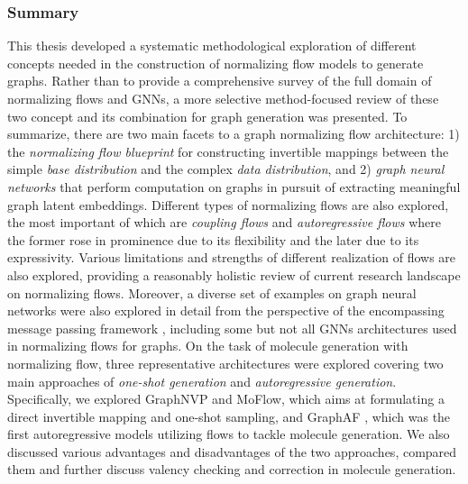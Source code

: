 \subsubsection{Summary}
This thesis developed a systematic methodological exploration of different
concepts needed in the construction of normalizing flow models to generate
graphs. Rather than to provide a comprehensive survey of the full domain of
normalizing flows and GNNs, a more selective method-focused review of these
two concept and its combination for graph generation was presented. To
summarize, there are two main facets to a graph normalizing flow architecture:
1) the \textit{normalizing flow blueprint} for constructing invertible mappings
between the simple \textit{base distribution} and the complex \textit{data
distribution}, and 2) \textit{graph neural networks} that perform computation on
graphs in pursuit of extracting meaningful graph latent embeddings. Different
types of normalizing flows are also explored, the most important of which are
\textit{coupling flows} and \textit{autoregressive flows} where the former rose
in prominence due to its flexibility and the later due to its expressivity.
Various limitations and strengths of different realization of flows are also
explored, providing a reasonably holistic review of current research landscape
on normalizing flows. Moreover, a diverse set of examples on graph neural
networks were also explored in detail from the perspective of the encompassing
message passing framework \citep{gilmerNeuralMessagePassing2017}, including some
but not all GNNs architectures used in normalizing flows for graphs. On the task
of molecule generation with normalizing flow, three representative architectures
were explored covering two main approaches of \textit{one-shot generation} and
\textit{autoregressive generation}. Specifically, we explored GraphNVP and
MoFlow, which aims at formulating a direct invertible mapping and one-shot
sampling, and GraphAF \citep{shiGraphAFFlowbasedAutoregressive2020}, which was
the first autoregressive models utilizing flows to tackle molecule generation.
We also discussed various advantages and disadvantages of the two approaches,
compared them and further discuss valency checking and correction in molecule
generation.



\appendix





